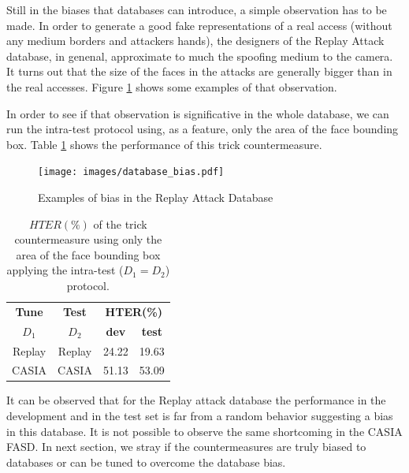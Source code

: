 Still in the biases that databases can introduce, a simple observation has to be made. In order to generate a good fake representations of a real access (without any medium borders and attackers hands), the designers of the Replay Attack database, in genenal, approximate to much the spoofing medium to the camera. It turns out that the size of the faces in the attacks are generally bigger than in the real accesses. Figure \ref{fig:database_bias} shows some examples of that observation. 

In order to see if that observation is significative in the whole database, we can run the intra-test protocol using, as a feature, only the area of the face bounding box. Table \ref{tb:TrickCounter} shows the performance of this trick countermeasure.

\begin{figure}[!btb]
\begin{center}
\texttt{[image: images/database\_bias.pdf]}
\caption[Examples of bias in the Replay Attack Database]{Examples of bias in the Replay Attack Database} 
\label{fig:database_bias}
\end{center}
\end{figure}


\begin{table}[ht!]
\caption{$HTER(\%)$ of the trick countermeasure using only the area of the face bounding box  applying the intra-test ($D_1 = D_2$) protocol.}
\begin{center}
  \begin{tabular}{ | c | c | c  c | }
    \hline

    \textbf{Tune} & \textbf{Test} & \multicolumn{2}{c|}{\textbf{HTER(\%)}} \\ 
     $D_1$ & $D_2$ & \textbf{dev} & \textbf{test}  \\ \hline
    
     Replay & Replay & 24.22 & 19.63  \\ 
     CASIA  & CASIA & 51.13 & 53.09  \\
    \hline
  \end{tabular}
\end{center}
\label{tb:TrickCounter}
\end{table}

It can be observed that for the Replay attack database the performance in the development and in the test set is far from a random behavior suggesting a bias in this database. It is not possible to observe the same shortcoming in the CASIA FASD. In next section, we stray if the countermeasures are truly biased to databases or can be tuned to overcome the database bias.

